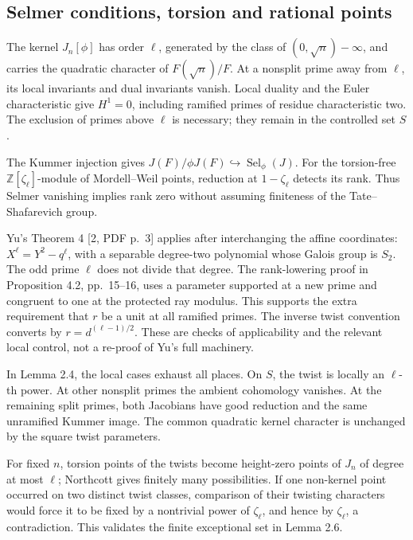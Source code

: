 \documentclass[10pt]{article}
\begin{document}
\subsection*{Selmer conditions, torsion and rational points}
The kernel \(J_n[\phi]\) has order \(\ell\), generated by the class of \((0,\sqrt n)-\infty\), and carries the quadratic character of \(F(\sqrt n)/F\). At a nonsplit prime away from \(\ell\), its local invariants and dual invariants vanish. Local duality and the Euler characteristic give \(H^1=0\), including ramified primes of residue characteristic two. The exclusion of primes above \(\ell\) is necessary; they remain in the controlled set \(S\).\par
The Kummer injection gives \(J(F)/\phi J(F)\hookrightarrow\operatorname{Sel}_\phi(J)\). For the torsion-free \(\mathbb Z[\zeta_\ell]\)-module of Mordell–Weil points, reduction at \(1-\zeta_\ell\) detects its rank. Thus Selmer vanishing implies rank zero without assuming finiteness of the Tate–Shafarevich group.\par
Yu’s Theorem 4 [2, PDF p. 3] applies after interchanging the affine coordinates: \(X^\ell=Y^2-q^\ell\), with a separable degree-two polynomial whose Galois group is \(S_2\). The odd prime \(\ell\) does not divide that degree. The rank-lowering proof in Proposition 4.2, pp. 15–16, uses a parameter supported at a new prime and congruent to one at the protected ray modulus. This supports the extra requirement that \(r\) be a unit at all ramified primes. The inverse twist convention converts by \(r=d^{(\ell-1)/2}\). These are checks of applicability and the relevant local control, not a re-proof of Yu’s full machinery.\par
In Lemma 2.4, the local cases exhaust all places. On \(S\), the twist is locally an \(\ell\)-th power. At other nonsplit primes the ambient cohomology vanishes. At the remaining split primes, both Jacobians have good reduction and the same unramified Kummer image. The common quadratic kernel character is unchanged by the square twist parameters.\par
For fixed \(n\), torsion points of the twists become height-zero points of \(J_n\) of degree at most \(\ell\); Northcott gives finitely many possibilities. If one non-kernel point occurred on two distinct twist classes, comparison of their twisting characters would force it to be fixed by a nontrivial power of \(\zeta_\ell\), and hence by \(\zeta_\ell\), a contradiction. This validates the finite exceptional set in Lemma 2.6.\par
\end{document}
